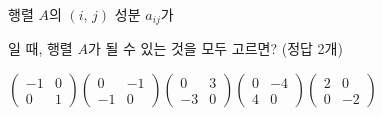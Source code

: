 행렬 $A$의 $(i,\,j)$ 성분 $a_{ij}$가\par\smallskip{}\par\smallskip\noindent 일 때, 행렬 $A$가 될 수 있는 것을 모두 고르면? (정답 2개)
\begin{choices32}{$\begin{pmatrix} -1 & 0 \\ 0 & 1 \end{pmatrix}$}{$\begin{pmatrix} 0 & -1 \\ -1 & 0 \end{pmatrix}$}{$\begin{pmatrix} 0 & 3 \\ -3 & 0 \end{pmatrix}$}{$\begin{pmatrix} 0 & -4 \\ 4 & 0 \end{pmatrix}$}{$\begin{pmatrix} 2 & 0 \\ 0 & -2 \end{pmatrix}$}\end{choices32}
